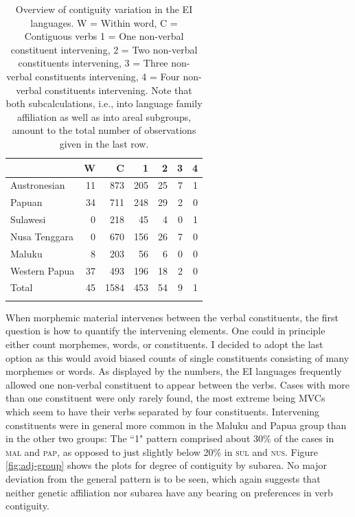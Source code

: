 \begin{table}
\begin{tabular}{lrrrrrr}
  \lsptoprule
 & W & C & 1 & 2 & 3 & 4 \tabularnewline 
  \hline
   Austronesian &   11 & 873 & 205 &  25 &  7 & 1 \tabularnewline 
   Papuan &  34 & 711 & 248 &  29 & 2 & 0 \tabularnewline 
   \hline
   Sulawesi &   0 & 218 &  45 &   4 &   0 &   1 \tabularnewline
   Nusa Tenggara &   0 & 670 & 156 &  26 &   7 &   0 \tabularnewline
   Maluku &   8 &  203 &  56 &  6 &   0 &   0 \tabularnewline 
   Western Papua &  37 & 493 & 196 &  18 &   2 &   0 \tabularnewline 
   \hline\hline
   Total & 45 & 1584 & 453 & 54 & 9 & 1 \tabularnewline
\lspbottomrule
\end{tabular}
\caption[Contiguity variation in the EI corpus]{Overview of contiguity variation in the EI languages. W = Within word, C = Contiguous verbs 1 = One non-verbal constituent intervening, 2 = Two non-verbal constituents intervening, 3 = Three non-verbal constituents intervening, 4 = Four non-verbal constituents intervening. Note that both subcalculations, i.e., into language family affiliation as well as into areal subgroups, amount to the total number of observations given in the last row.}
\label{table:Contiguity_overview}
\end{table}

When morphemic material intervenes between the verbal constituents, the first question is how to quantify the intervening elements. One could in principle either count morphemes, words, or constituents. I decided to adopt the last option as this would avoid biased counts of single constituents consisting of many morphemes or words. As displayed by the numbers, the EI languages frequently allowed one non-verbal constituent to appear between the verbs. Cases with more than one constituent were only rarely found, the most extreme being MVCs which seem to have their verbs separated by four constituents. Intervening constituents were in general more common in the Maluku and Papua group than in the other two groups: The ``1" pattern comprised about 30\% of the cases in  \textsc{mal} and \textsc{pap}, as opposed to just slightly below 20\% in \textsc{sul} and \textsc{nus}. Figure \ref{fig:adj-group} shows the plots for degree of contiguity by subarea. No major deviation from the general pattern is to be seen, which again suggests that neither genetic affiliation nor subarea have any bearing on preferences in verb contiguity.

